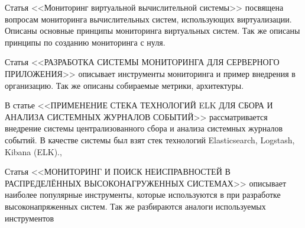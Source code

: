 Статья <<Мониторинг виртуальной вычислительной системы>> \cite{monitoring-virtualnoy-vychislitelnoy-sistemy}
посвящена вопросам мониторинга вычислительных систем, использующих виртуализации. Описаны основные принципы мониторинга виртуальных систем.
Так же описаны принципы по созданию мониторинга с нуля.

Статья <<РАЗРАБОТКА СИСТЕМЫ МОНИТОРИНГА ДЛЯ СЕРВЕРНОГО ПРИЛОЖЕНИЯ>> \cite{razrabotka-sistemy-monitoringa-dlya-servernogo-prilozheniya}
описывает инструменты мониторинга и пример внедрения в организацию. Так же описаны собираемые метрики, архитектуры.

В статье <<ПРИМЕНЕНИЕ СТЕКА ТЕХНОЛОГИЙ ELK ДЛЯ СБОРА И АНАЛИЗА СИСТЕМНЫХ ЖУРНАЛОВ СОБЫТИЙ>> \cite{primenenie-steka-tehnologiy-elk-dlya-sbora-i-analiza-sistemnyh-zhurnalov-sobytiy}
рассматривается внедрение системы централизованного сбора и анализа системных журналов событий. В качестве системы был взят стек технологий Elasticsearch, Logstash, Kibana (ELK).,

Статья <<МОНИТОРИНГ И ПОИСК НЕИСПРАВНОСТЕЙ В РАСПРЕДЕЛЁННЫХ ВЫСОКОНАГРУЖЕННЫХ СИСТЕМАХ>> \cite{monitoring-i-poisk-neispravnostey-v-raspredelyonnyh-vysokonagruzhennyh-sistemah}
описывает наиболее популярные инструменты, которые используются в при разработке высоконапряженных систем. 
Так же разбираются аналоги используемых инструментов